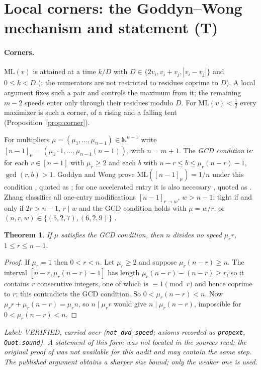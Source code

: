 \documentclass[11pt]{article}
\newtheorem{theorem}{Theorem}
\theoremstyle{remark}
\newcommand{\ML}{\mathrm{ML}}
\newcommand{\lab}[1]{\par\smallskip\noindent\textit{Label: #1.}}
\begin{document}
\section{Local corners: the Goddyn--Wong mechanism and statement (T)}\label{sec:corner}

\paragraph{Corners.} $\ML(v)$ is attained at a time $k/D$ with $D\in\{2v_i,v_i+v_j,|v_i-v_j|\}$ and $0\le k<D$ (\cite[Section~2]{PS25}; the numerators are not restricted to residues coprime to $D$). A local argument fixes such a pair and controls the maximum from it; the remaining $m-2$ speeds enter only through their residues modulo $D$. For $\ML(v)<\frac12$ every maximizer is such a corner, of a rising and a falling tent (Proposition~\ref{prop:corner}).

For multipliers $\mu=(\mu_1,\dots,\mu_{n-1})\in\mathbb N^{n-1}$ write $[n-1]_\mu=(\mu_1\cdot1,\dots,\mu_{n-1}(n-1))$, with $n=m+1$. The \emph{GCD condition} is: for each $r\in[n-1]$ with $\mu_r\ge2$ and each $b$ with $n-r\le b\le\mu_r(n-r)-1$, $\gcd(r,b)>1$. Goddyn and Wong prove $\ML([n-1]_\mu)=1/n$ under this condition \cite[Thm.~3.1]{GW06}, quoted as \cite[Thm.~5.1]{Zhang26}; for one accelerated entry it is also necessary \cite[Thm.~2.3]{GW06}, quoted as \cite[Thm.~1.1]{Zhang26}. Zhang classifies all one-entry modifications $[n-1]_{r\to w}$, $w>n-1$: tight if and only if $2r>n-1$, $r\mid w$ and the GCD condition holds with $\mu=w/r$, or $(n,r,w)\in\{(5,2,7),(6,2,9)\}$ \cite[Thm.~1.2]{Zhang26}.

\begin{theorem}\label{thm:O6}
If $\mu$ satisfies the GCD condition, then $n$ divides no speed $\mu_rr$, $1\le r\le n-1$.
\end{theorem}
\begin{proof}
If $\mu_r=1$ then $0<r<n$. Let $\mu_r\ge2$ and suppose $\mu_r(n-r)\ge n$. The interval $[n-r,\mu_r(n-r)-1]$ has length $\mu_r(n-r)-(n-r)\ge r$, so it contains $r$ consecutive integers, one of which is $\equiv1\pmod r$ and hence coprime to $r$; this contradicts the GCD condition. So $0<\mu_r(n-r)<n$. Now $\mu_rr+\mu_r(n-r)=\mu_rn$, so $n\mid\mu_rr$ would give $n\mid\mu_r(n-r)$, impossible for $0<\mu_r(n-r)<n$.
\end{proof}
\lab{VERIFIED, carried over (\texttt{not\_dvd\_speed}; axioms recorded as \texttt{propext}, \texttt{Quot.sound}). A statement of this form was not located in the sources read; the original proof of \cite[Thm.~3.1]{GW06} was not available for this audit and may contain the same step. The published argument obtains a sharper size bound; only the weaker one is used}
\end{document}
